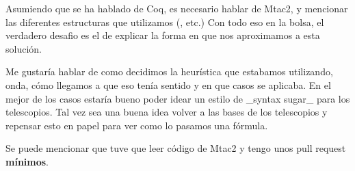 Asumiendo que se ha hablado de Coq, es necesario hablar de Mtac2, y mencionar las diferentes estructuras que utilizamos (, etc.)
Con todo eso en la bolsa, el verdadero desafio es el de explicar la forma en que nos aproximamos a esta solución.

Me gustaría hablar de como decidimos la heurística que estabamos utilizando, onda, cómo llegamos a que eso tenía sentido y en que casos se aplicaba. En el mejor de los casos estaría bueno poder idear un estilo de _syntax sugar_ para los telescopios. Tal vez sea una buena idea volver a las bases de los telescopios y repensar esto en papel para ver como lo pasamos una fórmula.

Se puede mencionar que tuve que leer código de Mtac2 y tengo unos pull request \textbf{mínimos}.
